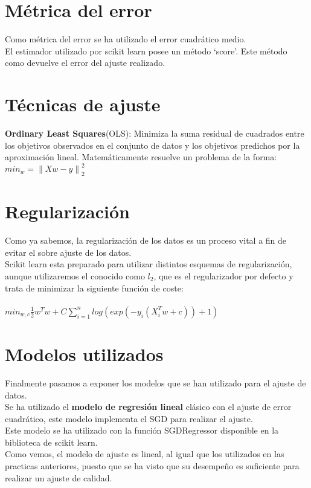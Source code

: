 \section{Métrica del error}
Como métrica del error se ha utilizado el error cuadrático medio.\\
El estimador utilizado por scikit learn \cite{SGDRegressor} posee un método `score'. Este método como devuelve el error del ajuste realizado.\\

\section{Técnicas de ajuste}
\textbf{Ordinary Least Squares}(OLS): Minimiza la suma residual de cuadrados entre los objetivos observados en el conjunto de datos y los objetivos predichos por la aproximación lineal. Matemáticamente resuelve un problema de la forma: $ min_w = \left \| Xw - y \right \|^{2}_{2} $ \cite{linearmodels}


\section{Regularización}
Como ya sabemos, la regularización de los datos es un proceso vital a fin de evitar el sobre ajuste de los datos.\\
Scikit learn esta preparado para utilizar distintos esquemas de regularización, aunque utilizaremos el conocido como $l_2$, que es el regularizador por defecto y trata de minimizar la siguiente función de coste:\\\\
$min_{w,c} \frac{1}{2} w^T w + C \sum_{i=1}^{n}log(exp(-y_i(X^T_iw+c))+1)$ \cite{linearmodels}\\

\section{Modelos utilizados}
Finalmente pasamos a exponer los modelos que se han utilizado para el ajuste de datos.
\\
Se ha utilizado el \textbf{modelo de regresión lineal} clásico con el ajuste de error cuadrático, este modelo implementa el SGD para realizar el ajuste.
\\
Este modelo se ha utilizado con la función SGDRegressor\cite{SGDRegressor} disponible en la biblioteca de scikit learn.\\
Como vemos, el modelo de ajuste es lineal, al igual que los utilizados en las practicas anteriores, puesto que se ha visto que su desempeño es suficiente para realizar un ajuste de calidad.


